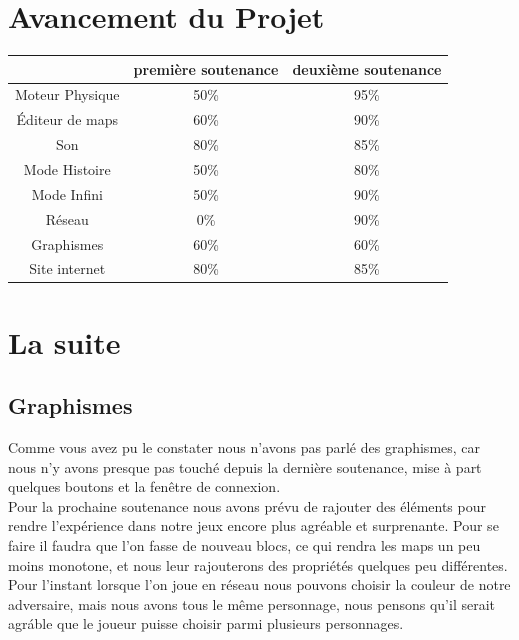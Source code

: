 \documentclass [11pt]{report}
\begin{document}
		
		
				
		
	
	
\chapter{Avancement du Projet}
	\renewcommand{\arraystretch}{2}
	\setlength{\tabcolsep}{0.7cm}
	\begin{tabular}{|c|c|c|}
	\hline  & premi\`ere soutenance & deuxi\`eme soutenance\\ 
	\hline Moteur Physique & 50\% & 95\% \\ 
	\hline \'Editeur de maps & 60\% & 90\% \\ 
	\hline Son & 80\% & 85\% \\ 
	\hline Mode Histoire & 50\% &  80\%\\ 
	\hline Mode Infini & 50\% & 90\% \\ 
	\hline Réseau &  0\% & 90\% \\ 
	\hline Graphismes & 60\% & 60\% \\ 
	\hline Site internet & 80\% & 85\% \\ 
	\hline
	\end{tabular} 
	
	
	
	
\chapter{La suite}
	\section{Graphismes}
		Comme vous avez pu le constater nous n'avons pas parl\'e des graphismes, car nous n'y avons presque pas touch\'e depuis la derni\`ere soutenance, mise \`a part quelques boutons et la fen\^etre de connexion. \\
	
		Pour la prochaine soutenance nous avons pr\'evu de rajouter des \'el\'ements  pour rendre l'exp\'erience dans notre jeux encore plus agr\'eable et surprenante. Pour se faire il faudra que l'on fasse de nouveau blocs, ce qui rendra les maps un peu moins monotone, et nous leur rajouterons des propri\'et\'es quelques peu diff\'erentes.\\
	
		Pour l'instant lorsque l'on joue en r\'eseau nous pouvons choisir la couleur de notre adversaire, mais nous avons tous le m\^eme personnage, nous pensons qu'il serait agr\'able que le joueur puisse choisir parmi plusieurs personnages.
	
\end{document}
